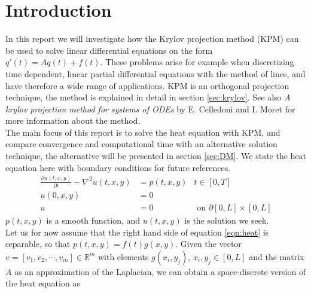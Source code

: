 \chapter{Introduction}%

In this report we will investigate how the Krylov projection method (KPM)  can be used to solve linear differential equations on the form $q'(t)=Aq(t)+f(t)$. These problems arise for example when discretizing time dependent, linear partial differential equations with the method of lines, and have therefore a wide range of applications. 
KPM is an orthogonal projection technique, the method is explained in detail in section \ref{sec:krylov}. See also \textit{A krylov projection method for systems of ODEs} by E. Celledoni and I. Moret \cite{elena} for more information about the method. \\


The main focus of this report is to solve the heat equation with KPM, and compare convergence and computational time with an alternative solution technique, the alternative will be presented in section \ref{sec:DM}.
We state the heat equation here with boundary conditions for future references. \\
\begin{equation} \label{eqn:heat}
\begin{aligned}
\frac{\partial u(t,x,y)}{\partial t} - \nabla^2 u(t,x,y) &= p(t,x,y) & t \in [0,T]\\
u(0,x,y) &= 0 \\
u & = 0 			&\text{ on } \partial [0,L] \times [0,L]
\end{aligned}
\end{equation}
$p(t,x,y)$ is a smooth function, and $u(t,x,y)$ is the solution we seek.\\

Let us for now assume that the right hand side of equation \eqref{eqn:heat} is separable, so that $p(t,x,y) = f(t)g(x,y) $. 
Given the vector $v = [v_1,v_2, \cdots, v_m] \in \mathbb{R}^m $ with elements $ g(x_i,y_j)$, $x_i,y_j \in [0,L]$ and the matrix $A$ as an approximation of the Laplacian, we can obtain a space-discrete version of the heat equation as

